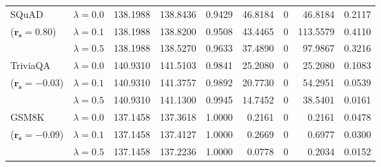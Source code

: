 \begin{table}[t]
{\begin{tabular}{l l rrrrrrr}
\midrule
SQuAD & $\lambda{=}0.0$ & 138.1988 & 138.8436 & \cellcolor{red!18} 0.9429 & \cellcolor{red!18} 46.8184 & \cellcolor{cyan!12} $0$ & \cellcolor{red!18} 46.8184 & \cellcolor{red!18} 0.2117 \\
{\small ($\mathbf{r_s{=}0.80}$)} & $\lambda{=}0.1$ & 138.1988 & 138.8200 & 0.9508 & 43.4465 & \cellcolor{cyan!12} $0$ & 113.5579 & 0.4110 \\
 & $\lambda{=}0.5$ & 138.1988 & 138.5270 & 0.9633 & 37.4890 & \cellcolor{cyan!12} $0$ & 97.9867 & 0.3216 \\
\midrule
TriviaQA & $\lambda{=}0.0$ & 140.9310 & 141.5103 & 0.9841 & 25.2080 & \cellcolor{cyan!12} $0$ & 25.2080 & 0.1083 \\
{\small ($\mathbf{r_s{=}-0.03}$)} & $\lambda{=}0.1$ & 140.9310 & 141.3757 & 0.9892 & 20.7730 & \cellcolor{cyan!12} $0$ & 54.2951 & 0.0539 \\
 & $\lambda{=}0.5$ & 140.9310 & 141.1300 & 0.9945 & 14.7452 & \cellcolor{cyan!12} $0$ & 38.5401 & 0.0161 \\
\midrule
GSM8K & $\lambda{=}0.0$ & 137.1458 & 137.3618 & 1.0000 & 0.2161 & \cellcolor{cyan!12} $0$ & 0.2161 & 0.0478 \\
{\small ($\mathbf{r_s{=}-0.09}$)} & $\lambda{=}0.1$ & 137.1458 & 137.4127 & 1.0000 & 0.2669 & \cellcolor{cyan!12} $0$ & 0.6977 & 0.0300 \\
 & $\lambda{=}0.5$ & 137.1458 & 137.2236 & 1.0000 & 0.0778 & \cellcolor{cyan!12} $0$ & 0.2034 & 0.0152 \\
\bottomrule
\end{tabular}}
\end{table}